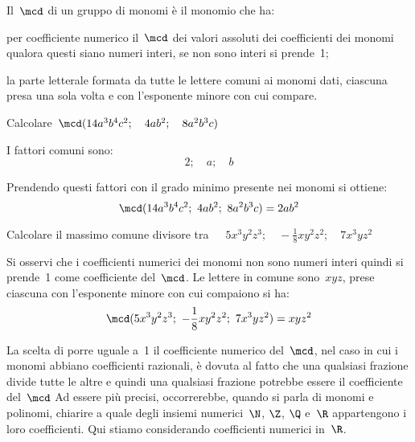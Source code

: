 \begin{procedura}

Il~\(\mcd\) di un gruppo di monomi è il monomio che ha:

\begin{enumeratea}
 \item per coefficiente numerico il~\(\mcd\) dei valori assoluti dei
coefficienti dei monomi qualora
questi siano numeri interi, se non sono interi si prende~1;
 \item la parte letterale formata da tutte le lettere comuni ai monomi
dati, ciascuna presa una sola volta e con l'esponente minore con cui 
compare.
\end{enumeratea}
\end{procedura}

 \begin{esempio}
Calcolare~\(\mcd (14a^{3}b^{4}c^{2}; \quad 4ab^{2}; \quad 8a^{2}b^{3}c)\) 

I fattori comuni sono:
\[2; \quad a; \quad b\]

Prendendo questi fattori con il grado minimo presente nei monomi 
si ottiene:
\[\mcd(14a^{3}b^{4}c^{2};~4ab^{2};~8a^{2}b^{3}c)=2ab^{2}\]
 \end{esempio}

 \begin{esempio}
Calcolare il massimo comune divisore 
tra~\(\quad 5x^{3}y^{2}z^{3}; \quad -\frac{1}{8}xy^{2}z^{2}; 
     \quad 7x^{3}yz^{2}\)

Si osservi che i coefficienti numerici dei monomi non sono numeri interi
quindi si prende~1 come coefficiente del~\(\mcd\).
Le lettere in comune sono~\(xyz\), prese ciascuna con
l'esponente minore con cui compaiono si ha:
\[\mcd(5x^{3}y^{2}z^{3};~-\frac{1}{8}xy^{2}z^{2};~7x^{3}yz^{2})=xyz^{2}\]
 \end{esempio}

\osservazione La scelta di porre uguale a~1 il coefficiente numerico 
del~\(\mcd\), nel
caso in cui i monomi abbiano coefficienti razionali, è dovuta al
fatto che una qualsiasi frazione divide tutte le altre e quindi una
qualsiasi frazione potrebbe essere il coefficiente del~\(\mcd\) Ad essere
più precisi, occorrerebbe, quando si parla di monomi e polinomi,
chiarire a quale degli insiemi numerici~\(\N\), \(\Z\), \(\Q\) e~\(\R\) 
appartengono i loro coefficienti. Qui stiamo considerando coefficienti 
numerici in~\(\R\).

